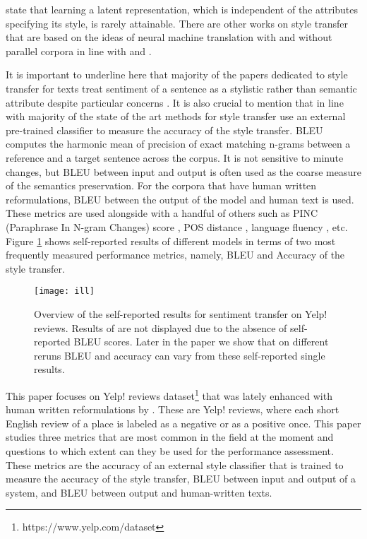 \documentclass[11pt,a4paper]{article}
\begin{document}
\citet{subramanian18} state that learning a latent representation, which is independent of the attributes specifying its style, is rarely attainable. There are other works on style transfer that are based on the ideas of neural machine translation with \cite{Carlson} and without parallel corpora \cite{zhang18} in line with \cite{Lample} and \cite{Artetxe}.

It is important to underline here that majority of the papers dedicated to style transfer for texts treat sentiment of a sentence as a stylistic rather than semantic attribute despite particular concerns \cite{TYwrong}. It is also crucial to mention that in line with \cite{fu2} majority of the state of the art methods for style transfer use an external pre-trained classifier to measure the accuracy of the style transfer. BLEU computes the harmonic mean of precision of exact matching n-grams between a reference and a target sentence across the corpus. It is not sensitive to minute changes, but BLEU between input and output is often used as the coarse measure of the semantics preservation. For the corpora that have human written reformulations, BLEU between the output of the model and human text is used. These metrics are used alongside with a handful of others such as PINC (Paraphrase In N-gram Changes) score \cite{Carlson}, POS distance \cite{tian18}, language fluency \cite{john18}, etc. Figure \ref{pic:il} shows self-reported results of different models in terms of two most frequently measured performance metrics, namely, BLEU and Accuracy of the style transfer. 

\begin{figure}[ht]
\begin{center}
\centerline{\texttt{[image: ill]}}
\caption{Overview of the self-reported results for sentiment transfer on Yelp! reviews. Results of \cite{romanov18} are not displayed due to the absence of self-reported BLEU scores. Later in the paper we show that on different reruns BLEU and accuracy can vary from these self-reported single results.}
\label{pic:il}
\end{center}
\end{figure}


This paper focuses on Yelp! reviews dataset\footnote{https://www.yelp.com/dataset} that was lately enhanced with human written reformulations by \cite{li}. These are Yelp! reviews, where each short English review of a place is labeled as a negative or as a positive once. This paper studies three metrics that are most common in the field at the moment and questions to which extent can they be used for the performance assessment. These metrics are the accuracy of an external style classifier that is trained to measure the accuracy of the style transfer, BLEU between input and output of a system, and BLEU between output and human-written texts. 
\end{document}
